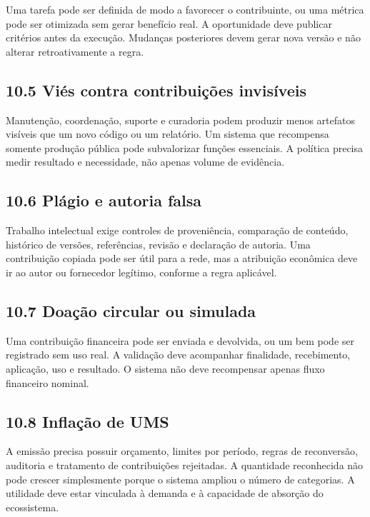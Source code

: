 \documentclass[12pt,a4paper]{article}
\begin{document}
Uma tarefa pode ser definida de modo a favorecer o contribuinte, ou uma métrica pode ser otimizada sem gerar benefício real. A oportunidade deve publicar critérios antes da execução. Mudanças posteriores devem gerar nova versão e não alterar retroativamente a regra.\\

\subsection{10.5 Viés contra contribuições invisíveis}

Manutenção, coordenação, suporte e curadoria podem produzir menos artefatos visíveis que um novo código ou um relatório. Um sistema que recompensa somente produção pública pode subvalorizar funções essenciais. A política precisa medir resultado e necessidade, não apenas volume de evidência.\\

\subsection{10.6 Plágio e autoria falsa}

Trabalho intelectual exige controles de proveniência, comparação de conteúdo, histórico de versões, referências, revisão e declaração de autoria. Uma contribuição copiada pode ser útil para a rede, mas a atribuição econômica deve ir ao autor ou fornecedor legítimo, conforme a regra aplicável.\\

\subsection{10.7 Doação circular ou simulada}

Uma contribuição financeira pode ser enviada e devolvida, ou um bem pode ser registrado sem uso real. A validação deve acompanhar finalidade, recebimento, aplicação, uso e resultado. O sistema não deve recompensar apenas fluxo financeiro nominal.\\

\subsection{10.8 Inflação de UMS}

A emissão precisa possuir orçamento, limites por período, regras de reconversão, auditoria e tratamento de contribuições rejeitadas. A quantidade reconhecida não pode crescer simplesmente porque o sistema ampliou o número de categorias. A utilidade deve estar vinculada à demanda e à capacidade de absorção do ecossistema.\\
\end{document}
